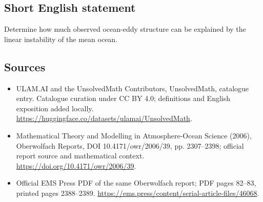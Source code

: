 \documentclass[11pt]{article}
\begin{document}
\subsection{Short English statement}
Determine how much observed ocean-eddy structure can be explained by the linear instability of the mean ocean.
\subsection{Sources}
\begin{itemize}
\item[\hypertarget{source:statement:1}{S1}] ULAM.AI and the UnsolvedMath Contributors, UnsolvedMath, catalogue entry. Catalogue curation under CC BY 4.0; definitions and English exposition added locally.
\url{https://huggingface.co/datasets/ulamai/UnsolvedMath}.
\item[\hypertarget{source:statement:2}{S2}] Mathematical Theory and Modelling in Atmosphere-Ocean Science (2006), Oberwolfach Reports, DOI 10.4171/owr/2006/39, pp. 2307--2398; official report source and mathematical context.
\url{https://doi.org/10.4171/owr/2006/39}.
\item[\hypertarget{source:statement:3}{S3}] Official EMS Press PDF of the same Oberwolfach report; PDF pages 82--83, printed pages 2388--2389.
\url{https://ems.press/content/serial-article-files/46068}.
\end{itemize}
\label{end:statement}
\end{document}
